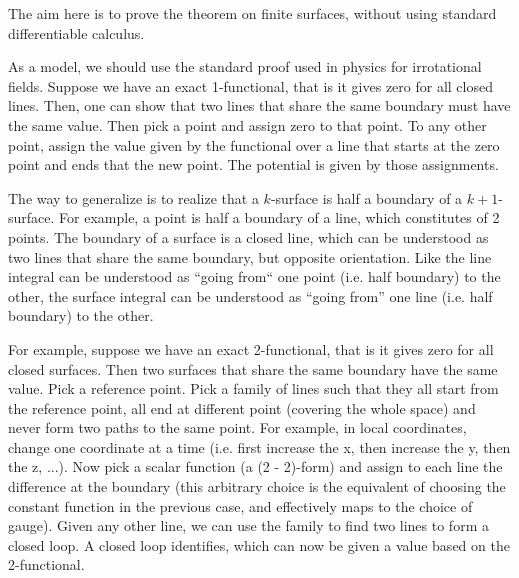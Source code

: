 \documentclass[11pt,letterpaper,fleqn]{memoir}
\begin{document}
\begin{remark}
	The aim here is to prove the theorem on finite surfaces, without using standard differentiable calculus.
	
	As a model, we should use the standard proof used in physics for irrotational fields. Suppose we have an exact 1-functional, that is it gives zero for all closed lines. Then, one can show that two lines that share the same boundary must have the same value. Then pick a point and assign zero to that point. To any other point, assign the value given by the functional over a line that starts at the zero point and ends that the new point. The potential is given by those assignments.
	
	The way to generalize is to realize that a $k$-surface is half a boundary of a $k+1$-surface. For example, a point is half a boundary of a line, which constitutes of 2 points. The boundary of a surface is a closed line, which can be understood as two lines that share the same boundary, but opposite orientation. Like the line integral can be understood as ``going from`` one point (i.e. half boundary) to the other, the surface integral can be understood as ``going from'' one line (i.e. half boundary) to the other.
	
	For example, suppose we have an exact 2-functional, that is it gives zero for all closed surfaces. Then two surfaces that share the same boundary have the same value. Pick a reference point. Pick a family of lines such that they all start from the reference point, all end at different point (covering the whole space) and never form two paths to the same point. For example, in local coordinates, change one coordinate at a time (i.e. first increase the x, then increase the y, then the z, ...). Now pick a scalar function (a (2 - 2)-form) and assign to each line the difference at the boundary (this arbitrary choice is the equivalent of choosing the constant function in the previous case, and effectively maps to the choice of gauge). Given any other line, we can use the family to find two lines to form a closed loop. A closed loop identifies, which can now be given a value based on the 2-functional.
	

\end{remark}
\end{document}
